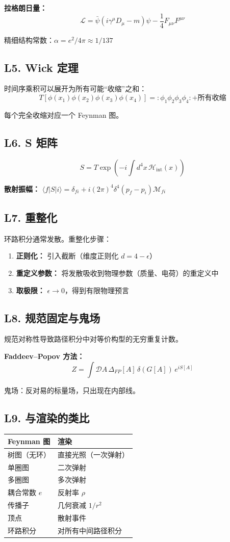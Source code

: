 \textbf{拉格朗日量：}
\[
\mathcal{L} = \bar{\psi}(i\gamma^\mu D_\mu - m)\psi - \frac{1}{4}F_{\mu\nu}F^{\mu\nu}
\]

精细结构常数：$\alpha = e^2/4\pi \approx 1/137$

\subsection{L5. Wick 定理}

时间序乘积可以展开为所有可能“收缩”之和：
\[
T[\phi(x_1)\phi(x_2)\phi(x_3)\phi(x_4)] = :\phi_1\phi_2\phi_3\phi_4: + \text{所有收缩}
\]

每个完全收缩对应一个 Feynman 图。

\subsection{L6. S 矩阵}

\[
S = T\exp\left(-i\int d^4x\, \mathcal{H}_{\text{int}}(x)\right)
\]

\textbf{散射振幅：} $\langle f|S|i\rangle = \delta_{fi} + i(2\pi)^4\delta^4(p_f - p_i)\mathcal{M}_{fi}$

\subsection{L7. 重整化}

环路积分通常发散。重整化步骤：
\begin{enumerate}
  \item \textbf{正则化：} 引入截断（维度正则化 $d = 4-\epsilon$）
  \item \textbf{重定义参数：} 将发散吸收到物理参数（质量、电荷）的重定义中
  \item \textbf{取极限：} $\epsilon \to 0$，得到有限物理预言
\end{enumerate}

\subsection{L8. 规范固定与鬼场}

规范对称性导致路径积分中对等价构型的无穷重复计数。

\textbf{Faddeev--Popov 方法：}
\[
Z = \int \mathcal{D}A\,\Delta_{FP}[A]\,\delta(G[A])\,e^{iS[A]}
\]

鬼场：反对易的标量场，只出现在内部线。

\subsection{L9. 与渲染的类比}

\begin{center}
\begin{tabular}{ll}
\toprule
\textbf{Feynman 图} & \textbf{渲染} \\
\midrule
树图（无环） & 直接光照（一次弹射） \\
单圈图 & 二次弹射 \\
多圈图 & 多次弹射 \\
耦合常数 $e$ & 反射率 $\rho$ \\
传播子 & 几何衰减 $1/r^2$ \\
顶点 & 散射事件 \\
环路积分 & 对所有中间路径积分 \\
\bottomrule
\end{tabular}
\end{center}